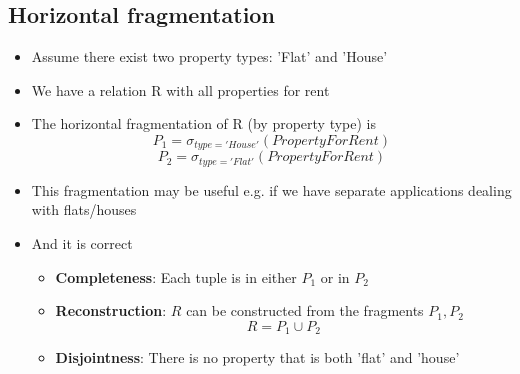\documentclass{article}[18pt]
\begin{document}
\subsection{Horizontal fragmentation}
\begin{itemize}
	\item Assume there exist two property types: 'Flat' and 'House'
	\item We have a relation R with all properties for rent
	\item The horizontal fragmentation of R (by property type) is
	$$P_1=\sigma_{type='House'}(PropertyForRent)$$
	$$P_2=\sigma_{type='Flat'}(PropertyForRent)$$
	\item This fragmentation may be useful e.g. if we have separate applications dealing with flats/houses
	\item And it is correct
	\begin{itemize}
		\item \textbf{Completeness}: Each tuple is in either $P_1$ or in $P_2$
		\item \textbf{Reconstruction}: $R$ can be constructed from the fragments $P_1,P_2$
		$$R=P_1\cup P_2$$
		\item \textbf{Disjointness}: There is no property that is both 'flat' and 'house'
	\end{itemize}
\end{itemize}
\end{document}
